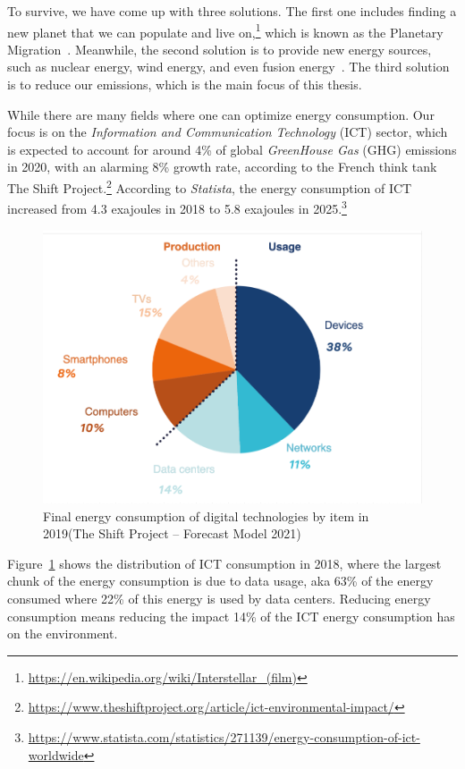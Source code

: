 To survive, we have come up with three solutions.
The first one includes finding a new planet that we can populate and live on,\footnote{\url{https://en.wikipedia.org/wiki/Interstellar_(film)}} which is known as the Planetary Migration~\cite{mapstone2022cyanobacteria}.
Meanwhile, the second solution is to provide new energy sources, such as nuclear energy, wind energy, and even fusion energy~\cite{gross1984fusion}.
The third solution is to reduce our emissions, which is the main focus of this thesis.

While there are many fields where one can optimize energy consumption.
Our focus is on the \emph{Information and Communication Technology} (ICT) sector, which is expected to account for around 4\% of global \emph{GreenHouse Gas} (GHG) emissions in 2020, with an alarming 8\% growth rate, according to the French think tank The Shift Project.\footnote{\url{ https://www.theshiftproject.org/article/ict-environmental-impact/}}
According to \emph{Statista}, the energy consumption of ICT increased from 4.3 exajoules in 2018 to 5.8 exajoules in 2025.\footnote{\url{https://www.statista.com/statistics/271139/energy-consumption-of-ict-worldwide}}
\begin{figure}[!h]
      \centering
      \includegraphics[width=.7\linewidth]{chapters/distribution_of_ict_consumption.png}
      \caption{Final energy consumption of digital technologies by item in 2019(The Shift Project – Forecast Model 2021\cite{shift_2021})}
      \label{fig:distribution_of_ict_consumption}
\end{figure}

Figure~\ref{fig:distribution_of_ict_consumption} shows the distribution of ICT consumption in 2018, where the largest chunk of the energy consumption is due to data usage, aka 63\% of the energy consumed where 22\% of this energy is used by data centers.
Reducing energy consumption means reducing the impact 14\% of the ICT energy consumption has on the environment.

